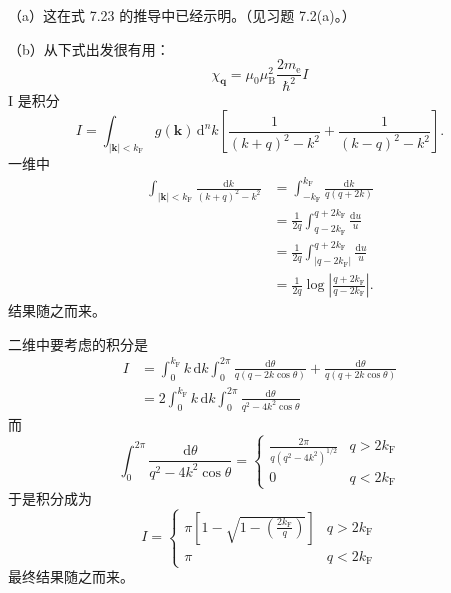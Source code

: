  （a）这在式 7.23 的推导中已经示明。（见习题 7.2(a)。）

（b）从下式出发很有用：
\begin{equation*}
\chi_{\mathbf{q}} = \mu_0\mu_{\mathrm{B}}^{2}\frac{2m_{\mathrm{e}}}{\hbar^{2}}I
\end{equation*}
I 是积分
\begin{equation*}
I = \int_{|\mathbf{k}|<k_{\mathrm{F}}}g(\mathbf{k})\,\mathrm{d}^{n}k\left[\frac{1}{(k+q)^{2}-k^{2}} + \frac{1}{(k-q)^{2}-k^{2}}\right].\tag{F.103}
\end{equation*}
一维中
\begin{align*}
\int_{|\mathbf{k}|<k_{\mathrm{F}}}\frac{\mathrm{d}k}{(k+q)^{2}-k^{2}} &= \int_{-k_{\mathrm{F}}}^{k_{\mathrm{F}}}\frac{\mathrm{d}k}{q(q+2k)}\\
&= \frac{1}{2q}\int_{q-2k_{\mathrm{F}}}^{q+2k_{\mathrm{F}}}\frac{\mathrm{d}u}{u}\\
&= \frac{1}{2q}\int_{|q-2k_{\mathrm{F}}|}^{q+2k_{\mathrm{F}}}\frac{\mathrm{d}u}{u}\\
&= \frac{1}{2q}\log\left|\frac{q+2k_{\mathrm{F}}}{q-2k_{\mathrm{F}}}\right|.\tag{F.104}
\end{align*}
结果随之而来。

二维中要考虑的积分是
\begin{align*}
I &= \int_{0}^{k_{\mathrm{F}}}k\,\mathrm{d}k\int_{0}^{2\pi}\frac{\mathrm{d}\theta}{q(q-2k\cos\theta)} + \frac{\mathrm{d}\theta}{q(q+2k\cos\theta)}\\
&= 2\int_{0}^{k_{\mathrm{F}}}k\,\mathrm{d}k\int_{0}^{2\pi}\frac{\mathrm{d}\theta}{q^{2}-4k^{2}\cos\theta}\tag{F.105}
\end{align*}
而
\begin{equation*}
\int_{0}^{2\pi}\frac{\mathrm{d}\theta}{q^{2}-4k^{2}\cos\theta} = \begin{cases} \frac{2\pi}{q(q^{2}-4k^{2})^{1/2}} & q>2k_{\mathrm{F}}\\ 0 & q<2k_{\mathrm{F}} \end{cases}\tag{F.106}
\end{equation*}
于是积分成为
\begin{equation*}
I = \begin{cases} \pi\left[1-\sqrt{1-\left(\frac{2k_{\mathrm{F}}}{q}\right)}\right] & q>2k_{\mathrm{F}}\\ \pi & q<2k_{\mathrm{F}} \end{cases}\tag{F.107}
\end{equation*}
最终结果随之而来。
